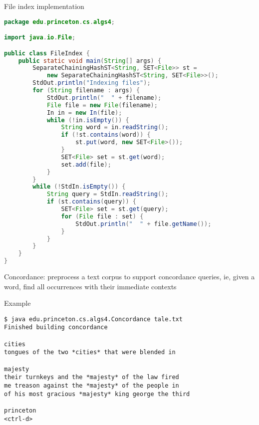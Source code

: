 \documentclass[8pt,a4paper,compress]{beamer}
\begin{document}
\begin{frame}[fragile]
\pause

File index implementation
\begin{lstlisting}[language=java,style=focusin]
package edu.princeton.cs.algs4;

import java.io.File;

public class FileIndex { 
    public static void main(String[] args) {
        SeparateChainingHashST<String, SET<File>> st = 
            new SeparateChainingHashST<String, SET<File>>();
        StdOut.println("Indexing files");
        for (String filename : args) {
            StdOut.println("  " + filename);
            File file = new File(filename);
            In in = new In(file);
            while (!in.isEmpty()) {
                String word = in.readString();
                if (!st.contains(word)) { 
                    st.put(word, new SET<File>());
                }
                SET<File> set = st.get(word);
                set.add(file);
            }
        }
        while (!StdIn.isEmpty()) {
            String query = StdIn.readString();
            if (st.contains(query)) {
                SET<File> set = st.get(query);
                for (File file : set) {
                    StdOut.println("  " + file.getName());
                }
            }
        }
    }
}
\end{lstlisting}
\end{frame}

\begin{frame}[fragile]
\pause

Concordance: preprocess a text corpus to support concordance queries, ie, given a word, find all occurrences with their immediate contexts

\pause
\bigskip

Example
\begin{lstlisting}[language={}]
$ java edu.princeton.cs.algs4.Concordance tale.txt
Finished building concordance

cities
tongues of the two *cities* that were blended in

majesty
their turnkeys and the *majesty* of the law fired
me treason against the *majesty* of the people in
of his most gracious *majesty* king george the third

princeton
<ctrl-d>
\end{lstlisting}
\end{frame}
\end{document}
